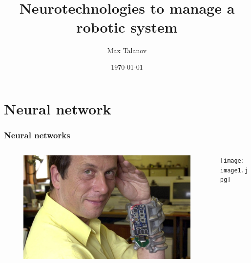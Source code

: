 \documentclass[12pt, aspectratio=169]{beamer}
\title[Neurotechnologies to manage a robotic system]{Neurotechnologies to manage a robotic system} %
\author[Max Talanov]{
  Max Talanov
}
\institute[NcN laboratory: ITIS : KFU]%
{
Neuromorphic computing and Neurosimulations laboratory, ITIS, KFU \\ %
\medskip
\textit{max.talanov@gmail.com} %
}
\date{\today} %
\begin{document}
\begin{frame}
\titlepage %
\end{frame}



\section{Neural network}
\begin{frame}
  \frametitle{Neural networks}
  \begin{columns}
    \begin{column}{0.5\textwidth}
      \begin{figure}
        \includegraphics[width=0.5\linewidth]{Kevin-Warwick_2936650k}
      \end{figure}
    \end{column}
    \begin{column}{0.5\textwidth}
      \texttt{[image: image1.jpg]}
    \end{column}
  \end{columns}
\end{frame}




\end{document}
